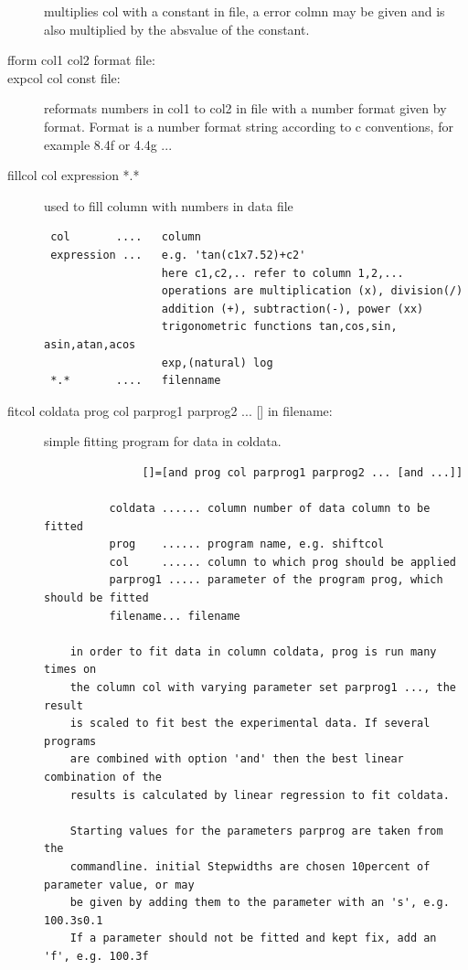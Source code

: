 \begin{description}
 multiplies col with a constant in file,
a error colmn may be given and is also multiplied by the absvalue of the constant.
\item [\prg fform\index{fform} col1 col2 format file:]\item [\prg expcol\index{expcol} col const file:]
 reformats numbers in col1 to col2 in file %
with
             a number format given by format. Format is a number format string according
             to c conventions, for example 8.4f or 4.4g  ...             
\item [\prg fillcol  col expression *.*\index{fillcol}]  used to fill column with numbers in data file
\begin{verbatim}
 col       ....   column
 expression ...   e.g. 'tan(c1x7.52)+c2'
                  here c1,c2,.. refer to column 1,2,...
                  operations are multiplication (x), division(/)
                  addition (+), subtraction(-), power (xx)
                  trigonometric functions tan,cos,sin, asin,atan,acos
                  exp,(natural) log
 *.*       ....   filenname
\end{verbatim}
\item [\prg fitcol coldata prog col parprog1 parprog2 ... {[]} in filename:]
simple fitting program for data in coldata.
\begin{verbatim}
               []=[and prog col parprog1 parprog2 ... [and ...]]

          coldata ...... column number of data column to be fitted
          prog    ...... program name, e.g. shiftcol
          col     ...... column to which prog should be applied
          parprog1 ..... parameter of the program prog, which should be fitted
          filename... filename

    in order to fit data in column coldata, prog is run many times on
    the column col with varying parameter set parprog1 ..., the result
    is scaled to fit best the experimental data. If several programs
    are combined with option 'and' then the best linear combination of the
    results is calculated by linear regression to fit coldata.

    Starting values for the parameters parprog are taken from the
    commandline. initial Stepwidths are chosen 10percent of parameter value, or may
    be given by adding them to the parameter with an 's', e.g. 100.3s0.1
    If a parameter should not be fitted and kept fix, add an 'f', e.g. 100.3f


\end{verbatim}
\end{description}
